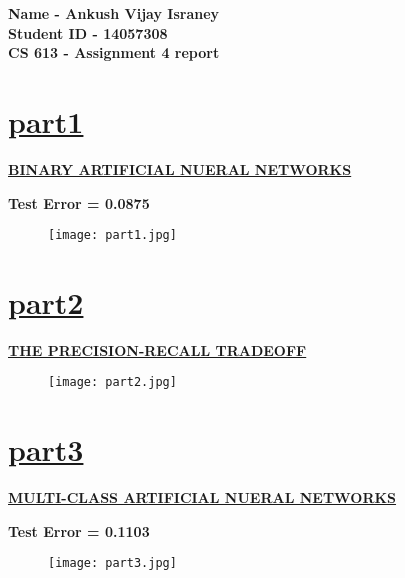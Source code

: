 \documentclass{report}
\begin{document}
 

\begin{flushleft}

\begin{Large}

\textbf{Name - Ankush Vijay Israney} \\
\textbf{Student ID - 14057308} \\
\textbf{CS 613 - Assignment 4 report} \\ 

\end{Large} 

\break

\section{\underline{part1}}
\underline { \textbf{BINARY ARTIFICIAL NUERAL NETWORKS}}  \linebreak[2]

\textbf{Test Error = 0.0875} 

\begin{figure}[tph!]
\centering
\texttt{[image: part1.jpg]}
\end{figure}

\break

\section{\underline{part2}}
\underline { \textbf{THE PRECISION-RECALL TRADEOFF}}  

\begin{figure}[ht!]
\centering
\texttt{[image: part2.jpg]}
\end{figure} 

\break

\section{\underline{part3}}
\underline { \textbf{MULTI-CLASS ARTIFICIAL NUERAL NETWORKS}}  \linebreak[2]

\textbf{Test Error = 0.1103} 

\begin{figure}[tph!]
\centering
\texttt{[image: part3.jpg]}
\end{figure}



\end{flushleft} 
\end{document}
